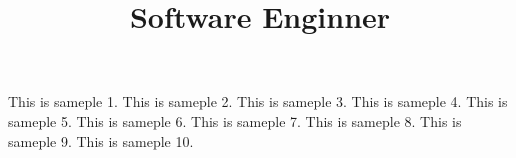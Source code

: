 \documentclass[a4paper,10pt,color,final]{moderncv}
\title{Software Enginner}
\begin{document}
    \makecvtitle
    \begin{vwcol}[widths={0.2,0.8}, sep=.8cm, justify=flush,rule=0pt,indent=1em] 
	This is sameple 1.
    This is sameple 2.
    This is sameple 3.
    This is sameple 4.
    This is sameple 5.
    This is sameple 6.
    This is sameple 7.
    This is sameple 8.
    This is sameple 9.
    This is sameple 10.
    \end{vwcol} 
\end{document}
